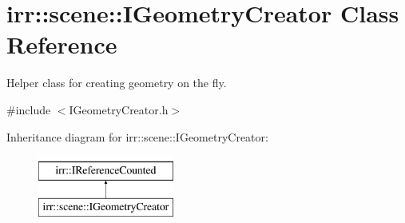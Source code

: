 \hypertarget{classirr_1_1scene_1_1IGeometryCreator}{}\section{irr\+:\+:scene\+:\+:I\+Geometry\+Creator Class Reference}
\label{classirr_1_1scene_1_1IGeometryCreator}


Helper class for creating geometry on the fly.  




{\ttfamily \#include $<$I\+Geometry\+Creator.\+h$>$}

Inheritance diagram for irr\+:\+:scene\+:\+:I\+Geometry\+Creator\+:\begin{figure}[H]
\begin{center}
\leavevmode
\includegraphics[height=2.000000cm]{classirr_1_1scene_1_1IGeometryCreator}
\end{center}
\end{figure}
